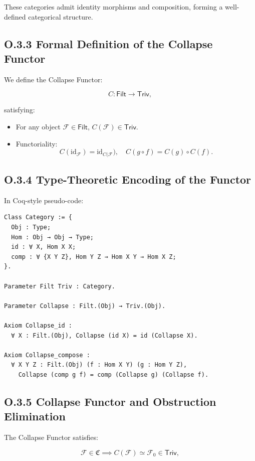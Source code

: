 \documentclass[11pt]{article}
\begin{document}
These categories admit identity morphisms and composition, forming a well-defined categorical structure.

\subsection*{O.3.3 Formal Definition of the Collapse Functor}

We define the Collapse Functor:

\[
C : \mathsf{Filt} \longrightarrow \mathsf{Triv},
\]

satisfying:

\begin{itemize}
  \item For any object \( \mathcal{F} \in \mathsf{Filt} \), \( C(\mathcal{F}) \in \mathsf{Triv} \).
  \item Functoriality:
  \[
  C(\mathrm{id}_{\mathcal{F}}) = \mathrm{id}_{C(\mathcal{F}}),
  \quad
  C(g \circ f) = C(g) \circ C(f).
  \]
\end{itemize}

\subsection*{O.3.4 Type-Theoretic Encoding of the Functor}

In Coq-style pseudo-code:

\begin{lstlisting}[language=Coq]
Class Category := {
  Obj : Type;
  Hom : Obj → Obj → Type;
  id : ∀ X, Hom X X;
  comp : ∀ {X Y Z}, Hom Y Z → Hom X Y → Hom X Z;
}.

Parameter Filt Triv : Category.

Parameter Collapse : Filt.(Obj) → Triv.(Obj).

Axiom Collapse_id :
  ∀ X : Filt.(Obj), Collapse (id X) = id (Collapse X).

Axiom Collapse_compose :
  ∀ X Y Z : Filt.(Obj) (f : Hom X Y) (g : Hom Y Z),
    Collapse (comp g f) = comp (Collapse g) (Collapse f).
\end{lstlisting}

\subsection*{O.3.5 Collapse Functor and Obstruction Elimination}

The Collapse Functor satisfies:

\[
\mathcal{F} \in \mathfrak{C} \implies C(\mathcal{F}) \simeq \mathcal{F}_0 \in \mathsf{Triv},
\]
\end{document}
